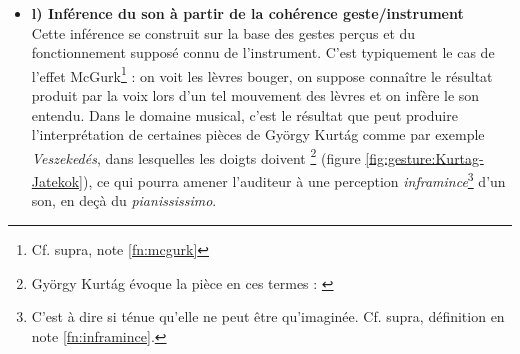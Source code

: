 \begin{itemize}[noitemsep]
	\item \textbf{l) Inférence du son à partir de la cohérence geste/instrument}\\
	Cette inférence se construit sur la base des gestes perçus et du fonctionnement supposé connu de l'instrument. C'est typiquement le cas de l'effet McGurk\footnote{Cf. supra, note \ref{fn:mcgurk}} : on voit les lèvres bouger, on suppose connaître le résultat produit par la voix lors d'un tel mouvement des lèvres et on infère le son entendu. Dans le domaine musical, c'est le résultat que peut produire l'interprétation de certaines pièces de György Kurtág comme par exemple \textit{Veszekedés}, dans lesquelles les doigts doivent \footnote{György Kurtág évoque la pièce en ces termes :  \cite{kurtag_gyorgy_2018}} (figure \ref{fig:gesture:Kurtag-Jatekok}), ce qui pourra amener l'auditeur à une perception \textit{inframince}\footnote{C'est à dire si ténue qu'elle ne peut être qu'imaginée. Cf. supra, définition en note \ref{fn:inframince}.} d'un son, en deçà du \textit{pianississimo}.


\end{itemize}

